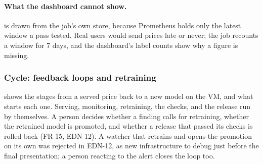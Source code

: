 \paragraph{What the dashboard cannot show.}
 is drawn from the job's own store, because Prometheus holds only the latest window a pass tested.
Real users would send prices late or never; the job recounts a window for 7 days, and the dashboard's label counts show why a figure is missing.

\subsubsection{Cycle: feedback loops and retraining}
\label{sec:m6-feedback}

 shows the stages from a served price back to a new model on the VM, and what starts each one.
Serving, monitoring, retraining, the checks, and the release run by themselves.
A person decides whether a finding calls for retraining, whether the retrained model is promoted, and whether a release that passed its checks is rolled back (FR-15, EDN-12).
A watcher that retrains and opens the promotion on its own was rejected in EDN-12, as new infrastructure to debug just before the final presentation; a person reacting to the alert closes the loop too.

